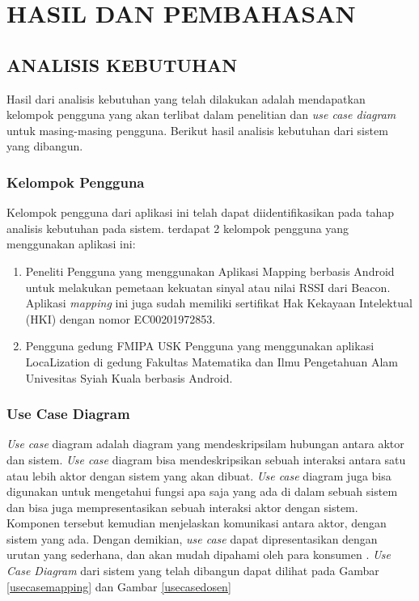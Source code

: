\fancyhf{}
\fancyfoot[C]{\thepage}
\chapter{HASIL DAN PEMBAHASAN}
\section{ANALISIS KEBUTUHAN}

Hasil dari analisis kebutuhan yang telah dilakukan adalah mendapatkan kelompok pengguna yang akan terlibat dalam penelitian dan \textit{use case diagram} untuk masing-masing pengguna. Berikut hasil analisis kebutuhan dari sistem yang dibangun.
\subsection{Kelompok Pengguna}
Kelompok pengguna dari aplikasi ini telah dapat diidentifikasikan pada tahap analisis kebutuhan pada sistem. terdapat 2 kelompok pengguna yang menggunakan aplikasi ini:
\begin{enumerate}[1.]
	\item Peneliti
	      \newline Pengguna yang menggunakan Aplikasi Mapping berbasis Android untuk melakukan pemetaan kekuatan sinyal atau nilai RSSI dari Beacon. Aplikasi \textit{mapping} ini juga sudah memiliki sertifikat Hak Kekayaan Intelektual (HKI) dengan nomor EC00201972853.
	\item Pengguna gedung FMIPA USK
	      \newline Pengguna yang menggunakan aplikasi LocaLization di gedung Fakultas Matematika dan Ilmu Pengetahuan Alam Univesitas Syiah Kuala berbasis Android.
\end{enumerate}

\subsection{Use Case Diagram}
\textit{Use case} diagram adalah diagram yang mendeskripsilam hubungan antara aktor dan sistem. \textit{Use case} diagram bisa mendeskripsikan sebuah interaksi antara satu atau lebih aktor dengan sistem yang akan dibuat. \textit{Use case} diagram juga bisa digunakan untuk mengetahui fungsi apa saja yang ada di dalam sebuah sistem dan  bisa juga mempresentasikan sebuah interaksi aktor dengan sistem. Komponen tersebut kemudian menjelaskan komunikasi antara aktor,  dengan sistem yang ada. Dengan demikian, \textit{use case} dapat dipresentasikan dengan urutan yang sederhana, dan akan mudah dipahami oleh para konsumen \citep{Yu2009}. \textit{Use Case Diagram} dari sistem yang telah dibangun dapat dilihat pada Gambar \ref{usecasemapping} dan Gambar \ref{usecasedosen}

